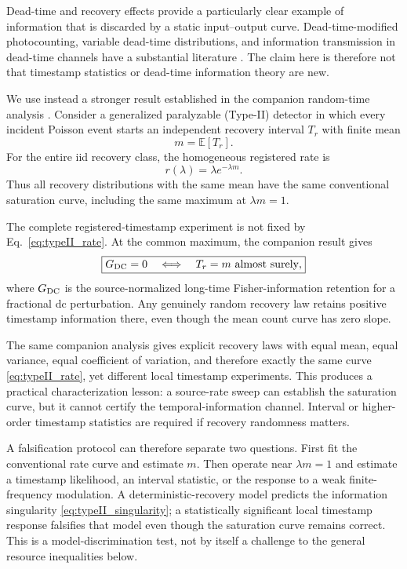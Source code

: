 \documentclass[aps,pra,reprint,superscriptaddress,longbibliography]{revtex4-2}
\begin{document}
Dead-time and recovery effects provide a particularly clear example of information that is discarded by a static input--output curve. Dead-time-modified photocounting, variable dead-time distributions, and information transmission in dead-time channels have a substantial literature \cite{CantorMatinTeich1975,TeichCantor1978,TeichVannucci1978,ApanasovichPaltsev1995,Peterson2021,JorgensenJohnson2026}. The claim here is therefore not that timestamp statistics or dead-time information theory are new.

We use instead a stronger result established in the companion random-time analysis \cite{CompanionMemory2026}. Consider a generalized paralyzable (Type-II) detector in which every incident Poisson event starts an independent recovery interval $T_r$ with finite mean
\begin{equation}
m=\mathbb E[T_r].
\end{equation}
For the entire iid recovery class, the homogeneous registered rate is
\begin{equation}
\boxed{r(\lambda)=\lambda e^{-\lambda m}.}
\label{eq:typeII_rate}
\end{equation}
Thus all recovery distributions with the same mean have the same conventional saturation curve, including the same maximum at $\lambda m=1$.

The complete registered-timestamp experiment is not fixed by Eq.~\eqref{eq:typeII_rate}. At the common maximum, the companion result gives
\begin{equation}
\boxed{
G_{\rm DC}=0
\quad\Longleftrightarrow\quad
T_r=m\ \text{almost surely},}
\label{eq:typeII_singularity}
\end{equation}
where $G_{\rm DC}$ is the source-normalized long-time Fisher-information retention for a fractional dc perturbation. Any genuinely random recovery law retains positive timestamp information there, even though the mean count curve has zero slope.

The same companion analysis gives explicit recovery laws with equal mean, equal variance, equal coefficient of variation, and therefore exactly the same curve \eqref{eq:typeII_rate}, yet different local timestamp experiments. This produces a practical characterization lesson: a source-rate sweep can establish the saturation curve, but it cannot certify the temporal-information channel. Interval or higher-order timestamp statistics are required if recovery randomness matters.

A falsification protocol can therefore separate two questions. First fit the conventional rate curve and estimate $m$. Then operate near $\lambda m=1$ and estimate a timestamp likelihood, an interval statistic, or the response to a weak finite-frequency modulation. A deterministic-recovery model predicts the information singularity \eqref{eq:typeII_singularity}; a statistically significant local timestamp response falsifies that model even though the saturation curve remains correct. This is a model-discrimination test, not by itself a challenge to the general resource inequalities below.
\end{document}
